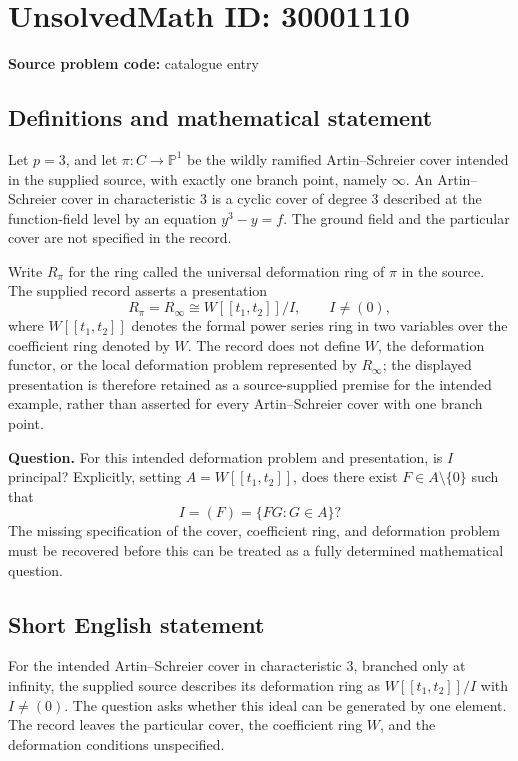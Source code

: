 \documentclass[11pt]{article}
\newcommand{\PP}{\mathbb{P}}
\begin{document}
\section*{UnsolvedMath ID: 30001110}
\textbf{Source problem code:} catalogue entry
\subsection{Definitions and mathematical statement}
Let \(p=3\), and let \(\pi:C\to\PP^1\) be the wildly ramified Artin--Schreier cover intended in the supplied source, with exactly one branch point, namely \(\infty\). An Artin--Schreier cover in characteristic \(3\) is a cyclic cover of degree \(3\) described at the function-field level by an equation \(y^3-y=f\). The ground field and the particular cover are not specified in the record.

Write \(R_\pi\) for the ring called the universal deformation ring of \(\pi\) in the source. The supplied record asserts a presentation
\[
R_\pi=R_\infty\cong W[[t_1,t_2]]/I,\qquad I\ne(0),
\]
where \(W[[t_1,t_2]]\) denotes the formal power series ring in two variables over the coefficient ring denoted by \(W\). The record does not define \(W\), the deformation functor, or the local deformation problem represented by \(R_\infty\); the displayed presentation is therefore retained as a source-supplied premise for the intended example, rather than asserted for every Artin--Schreier cover with one branch point.

\textbf{Question.} For this intended deformation problem and presentation, is \(I\) principal? Explicitly, setting \(A=W[[t_1,t_2]]\), does there exist \(F\in A\setminus\{0\}\) such that
\[
I=(F)=\{FG:G\in A\}?
\]
The missing specification of the cover, coefficient ring, and deformation problem must be recovered before this can be treated as a fully determined mathematical question.
\subsection{Short English statement}
For the intended Artin--Schreier cover in characteristic \(3\), branched only at infinity, the supplied source describes its deformation ring as \(W[[t_1,t_2]]/I\) with \(I\ne(0)\). The question asks whether this ideal can be generated by one element. The record leaves the particular cover, the coefficient ring \(W\), and the deformation conditions unspecified.
\end{document}
